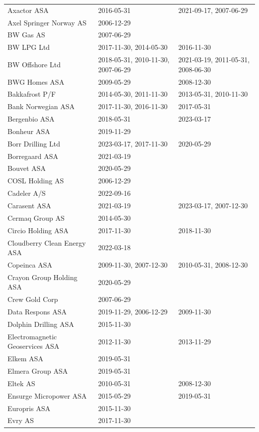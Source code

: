 \begin{appendices}
\begin{table}[H]
\begin{tabular}{lll}
Axactor ASA & 2016-05-31 & 2021-09-17, 2007-06-29 \\
Axel Springer Norway AS & 2006-12-29 & \\
BW Gas AS & 2007-06-29 & \\
BW LPG Ltd & 2017-11-30, 2014-05-30 & 2016-11-30 \\
BW Offshore Ltd & 2018-05-31, 2010-11-30, 2007-06-29 & 2021-03-19, 2011-05-31, 2008-06-30 \\
BWG Homes ASA & 2009-05-29 & 2008-12-30 \\
Bakkafrost P/F & 2014-05-30, 2011-11-30 & 2013-05-31, 2010-11-30 \\
Bank Norwegian ASA & 2017-11-30, 2016-11-30 & 2017-05-31 \\
Bergenbio ASA & 2018-05-31 & 2023-03-17 \\
Bonheur ASA & 2019-11-29 & \\
Borr Drilling Ltd & 2023-03-17, 2017-11-30 & 2020-05-29 \\
Borregaard ASA & 2021-03-19 & \\
Bouvet ASA & 2020-05-29 & \\
COSL Holding AS & 2006-12-29 & \\
Cadeler A/S & 2022-09-16 & \\
Carasent ASA & 2021-03-19 & 2023-03-17, 2007-12-30 \\
Cermaq Group AS & 2014-05-30 & \\
Circio Holding ASA & 2017-11-30 & 2018-11-30 \\
Cloudberry Clean Energy ASA & 2022-03-18 & \\
Copeinca ASA & 2009-11-30, 2007-12-30 & 2010-05-31, 2008-12-30 \\
Crayon Group Holding ASA & 2020-05-29 & \\
Crew Gold Corp & 2007-06-29 & \\
Data Respons ASA & 2019-11-29, 2006-12-29 & 2009-11-30 \\
Dolphin Drilling ASA & 2015-11-30 & \\
Electromagnetic Geoservices ASA & 2012-11-30 & 2013-11-29 \\
Elkem ASA & 2019-05-31 & \\
Elmera Group ASA & 2019-05-31 & \\
Eltek AS & 2010-05-31 & 2008-12-30 \\
Ensurge Micropower ASA & 2015-05-29 & 2019-05-31 \\
Europris ASA & 2015-11-30 & \\
Evry AS & 2017-11-30 & \\

\end{tabular}
\end{table}
\end{appendices}
